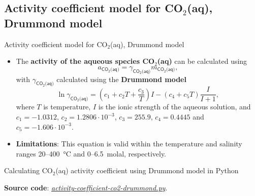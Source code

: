 \subsection{Activity coefficient model for CO$_2$(aq), Drummond model}
%
%
\begin{frame}{Activity coefficient model for CO$_{2}$(aq), Drummond model}
\begin{itemize}[<+->]
\item The \textbf{activity of the aqueous species CO$_{2}$(aq)} can be calculated
using
\[
a_{\mathsf{CO_{2}\text{(aq)}}}=\gamma_{\mathsf{CO_{2}\text{(aq)}}}m_{\mathsf{CO_{2}\text{(aq)}}},
\]
with $\gamma_{\mathsf{CO_{2}\text{(aq)}}}$ calculated using the \alert{\textbf{Drummond model}}
\[
\boxed{\ln\gamma_{\mathsf{CO_{2}\text{(aq)}}}=\left(c_{1}+c_{2}T+\frac{c_{3}}{T}\right)I-(c_{4}+c_{5}T)\frac{I}{I+1}},
\]
where $T$ is temperature,  
$I$ is the ionic strength of the aqueous solution, and 
${c_{1}=-1.0312}$, ${c_{2}=1.2806\cdot10^{-3}}$, ${c_{3}=255.9}$,
${c_{4}=0.4445}$ and ${c_{5}=-1.606\cdot10^{-3}}$. 
\item \textbf{Limitations}: This equation is valid within the temperature and salinity ranges
20–400~°C and 0–6.5~molal, respectively.
\end{itemize}
\end{frame}
%
%
\begin{frame}{Calculating CO$_{2}$(aq) activity coefficient using Drummond model in Python}



\textbf{Source code}: \href{https://polybox.ethz.ch/index.php/s/Cg91f6PR1xIuKzY}{\textcolor{indigo(dye)}{\it  activity-coefficient-co2-drummond.py}}.

\end{frame}
%
